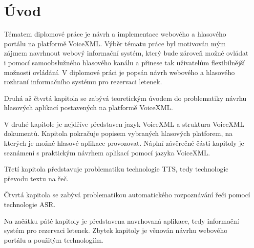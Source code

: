 \documentclass[ing,male,java,dept460,twoside]{diploma}						%
\begin{document}
\MakeTitlePages

\tableofcontents
\cleardoublepage	%

\listoftables
\cleardoublepage	%

\listoffigures
\cleardoublepage	%


\lstlistoflistings
\cleardoublepage	%

\section{Úvod}
\label{sec:Uvod}
Tématem diplomové práce je návrh a implementace webového a hlasového portálu na platformě VoiceXML. Výběr tématu práce byl motivován mým zájmem navrhnout webový informační systém, který bude zároveň možné ovládat i pomocí samoobslužného hlasového kanálu a přinese tak uživatelům flexibilnější možnosti ovládání. V diplomové práci je popsán návrh webového a hlasového rozhraní informačního systému pro rezervaci letenek.

Druhá až čtvrtá kapitola se zabývá teoretickým úvodem do problematiky návrhu hlasových aplikací postavených na platformě VoiceXML.

V druhé kapitole je nejdříve představen jazyk VoiceXML a struktura VoiceXML dokumentů. Kapitola pokračuje popisem vybraných hlasových platforem, na kterých je možné hlasové aplikace provozovat. Náplní závěrečné části kapitoly je seznámení s praktickým návrhem aplikací pomocí jazyka VoiceXML.

Třetí kapitola představuje problematiku technologie TTS, tedy technologie převodu textu na řeč.

Čtvrtá kapitola se zabývá problematikou automatického rozpoznávání řeči pomocí technologie ASR.

Na začátku páté kapitoly je představena navrhovaná aplikace, tedy informační systém pro rezervaci letenek. Zbytek kapitoly je věnován návrhu webového portálu a použitým technologiím.
\end{document}
